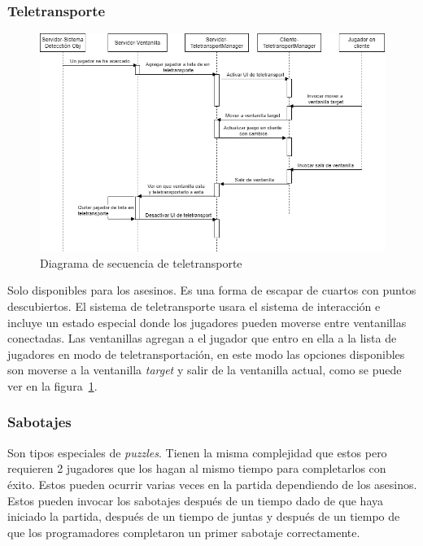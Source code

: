 \subsubsection{Teletransporte}
\begin{figure}[h]
    \centering
    \includegraphics[width=1\linewidth]{images/DiagramaSecuenciaTeletransporte.png}
    \caption{Diagrama de secuencia de teletransporte}
    \label{fig:diagrama_sec_teletransporte}
\end{figure}
Solo disponibles para los asesinos. Es una forma de escapar de cuartos con puntos descubiertos. El sistema de teletransporte usara el sistema de interacción e incluye un estado especial donde los jugadores pueden moverse entre ventanillas conectadas. Las ventanillas agregan a el jugador que entro en ella a la lista de jugadores en modo de teletransportación, en este modo las opciones disponibles son moverse a la ventanilla \textit{target} y salir de la ventanilla actual, como se puede ver en la figura~\ref{fig:diagrama_sec_teletransporte}.

\subsubsection{Sabotajes}
Son tipos especiales de \textit{puzzles}. Tienen la misma complejidad que estos pero requieren 2 jugadores que los hagan al mismo tiempo para completarlos con éxito. Estos pueden ocurrir varias veces en la partida dependiendo de los asesinos. Estos pueden invocar los sabotajes después de un tiempo dado de que haya iniciado la partida, después de un tiempo de juntas y después de un tiempo de que los programadores completaron un primer sabotaje correctamente.

